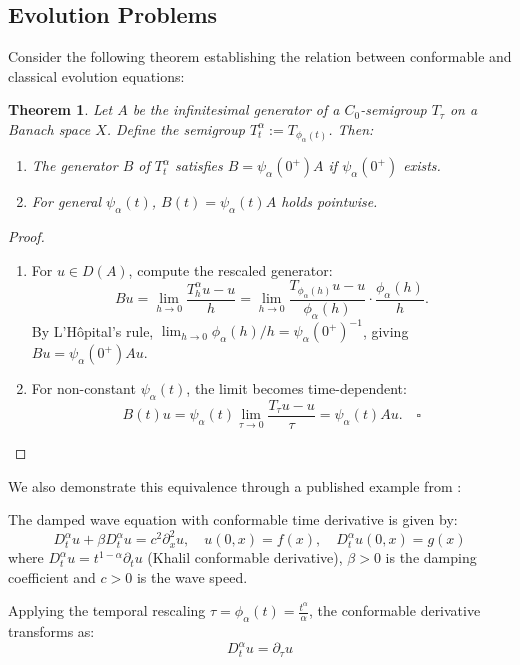 \documentclass[preprint,12pt]{elsarticle}
\newtheorem{theorem}{Theorem}
\newtheorem{proof}{Proof}
\begin{document}
\subsection{Evolution Problems}
Consider the following theorem establishing the relation between conformable and classical evolution equations:
\begin{theorem}\label{semigroup} Let \(A\) be the infinitesimal generator of a \(C_0\)-semigroup \(T_\tau\) on a Banach space \(X\). Define the semigroup \(T^\alpha_t := T_{\phi_\alpha(t)}\). Then:
\begin{enumerate}
\item The generator \(B\) of \(T^\alpha_t\) satisfies \(B = \psi_\alpha(0^+) A\) if \(\psi_\alpha(0^+)\) exists.
\item For general \(\psi_\alpha(t)\), \(B(t) = \psi_\alpha(t) A\) holds pointwise.
\end{enumerate}
\end{theorem}
\begin{proof}
\begin{enumerate}
\item  For \(u \in D(A)\), compute the rescaled generator:
   \[
   Bu = \lim_{h \to 0} \frac{T^\alpha_h u - u}{h} = \lim_{h \to 0} \frac{T_{\phi_\alpha(h)}u - u}{\phi_\alpha(h)} \cdot \frac{\phi_\alpha(h)}{h}.
   \]
   By L'Hôpital's rule, \(\lim_{h \to 0} \phi_\alpha(h)/h = \psi_\alpha(0^+)^{-1}\), giving \(Bu = \psi_\alpha(0^+) Au\).

\item For non-constant \(\psi_\alpha(t)\), the limit becomes time-dependent:
   \[
   B(t)u = \psi_\alpha(t) \lim_{\tau \to 0} \frac{T_\tau u - u}{\tau} = \psi_\alpha(t) Au. \quad \square
   \]
\end{enumerate}
\end{proof}

We also demonstrate this equivalence through a published example from \cite{abdeljawad2015}:

The damped wave equation with conformable time derivative is given by:
\begin{equation}
D_t^\alpha u + \beta D_t^\alpha u = c^2 \partial_x^2 u, \quad u(0,x) = f(x), \quad D_t^\alpha u(0,x) = g(x)
\end{equation}
where $D_t^\alpha u = t^{1-\alpha}\partial_t u$ (Khalil conformable derivative), $\beta > 0$ is the damping coefficient and $c > 0$ is the wave speed.

Applying the temporal rescaling $\tau = \phi_\alpha(t) = \frac{t^\alpha}{\alpha}$, the conformable derivative transforms as:
\begin{equation}
D_t^\alpha u = \partial_\tau u
\end{equation}
\end{document}
